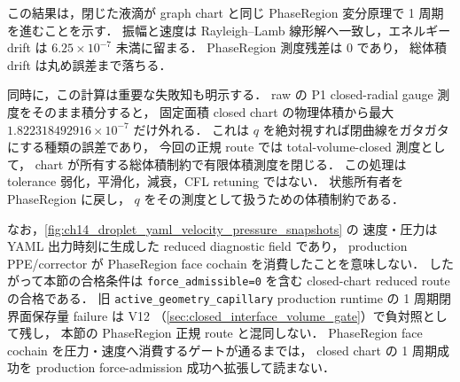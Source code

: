 この結果は，閉じた液滴が graph chart と同じ PhaseRegion 変分原理で
1 周期を進むことを示す．
振幅と速度は Rayleigh--Lamb 線形解へ一致し，エネルギー drift は
$6.25\times10^{-7}$ 未満に留まる．
PhaseRegion 測度残差は $0$ であり，
総体積 drift は丸め誤差まで落ちる．

同時に，この計算は重要な失敗知も明示する．
raw の P1 closed-radial gauge 測度をそのまま積分すると，
固定面積 closed chart の物理体積から最大
$1.822318492916\times10^{-7}$ だけ外れる．
これは $q$ を絶対視すれば閉曲線をガタガタにする種類の誤差であり，
今回の正規 route では total-volume-closed 測度として，
chart が所有する総体積制約で有限体積測度を閉じる．
この処理は tolerance 弱化，平滑化，減衰，CFL retuning ではない．
状態所有者を PhaseRegion に戻し，
$q$ をその測度として扱うための体積制約である．

なお，\autoref{fig:ch14_droplet_yaml_velocity_pressure_snapshots} の
速度・圧力は YAML 出力時刻に生成した reduced diagnostic field であり，
production PPE/corrector が PhaseRegion face cochain を消費したことを意味しない．
したがって本節の合格条件は
\texttt{force\_admissible=0} を含む closed-chart reduced route の合格である．
旧 \texttt{active\_geometry\_capillary} production runtime の
1 周期閉界面保存量 failure は V12
（\autoref{sec:closed_interface_volume_gate}）で負対照として残し，
本節の PhaseRegion 正規 route と混同しない．
PhaseRegion face cochain を圧力・速度へ消費するゲートが通るまでは，
closed chart の 1 周期成功を production force-admission 成功へ拡張して読まない．

